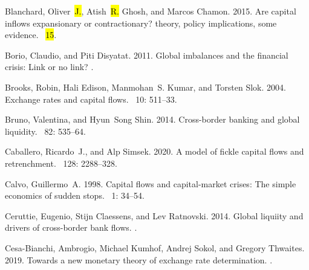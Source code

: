 \documentclass[jrfm,article,accept,moreauthors,pdftex]{Definitions/mdpi}
\begin{document}
\begin{thebibliography}{999}
Blanchard, Oliver~\hl{J.}, Atish~\hl{R.} Ghosh, and Marcos Chamon. 2015.
\newblock Are capital inflows expansionary or contractionary? theory, policy
  implications, some evidence.
~\hl{15}.%

Borio, Claudio, and Piti Disyatat. 2011.
\newblock Global imbalances and the financial crisis: Link or no link?
. %


Brooks, Robin, Hali Edison, Manmohan~S. Kumar, and Torsten Slok. 2004.
\newblock Exchange rates and capital flows.
~{10}: 511--33.

Bruno, Valentina, and Hyun~Song Shin. 2014.
\newblock Cross-border banking and global liquidity.
~{82}: 535--64.

Caballero, Ricardo~J., and Alp Simsek. 2020.
\newblock A model of fickle capital flows and retrenchment.
~{128}: 2288--328.

Calvo, Guillermo~A. 1998.
\newblock Capital flows and capital-market crises{:} The simple economics of
  sudden stops.
~{1}: 34--54.

Ceruttie, Eugenio, Stijn Claessens, and Lev Ratnovski. 2014.
\newblock Global liquiity and drivers of cross-border bank flows.
.%

Cesa-Bianchi, Ambrogio, Michael Kumhof, Andrej Sokol, and Gregory Thwaites.
  2019.
\newblock Towards a new monetary theory of exchange rate determination.
.%


\end{thebibliography}
\end{document}
